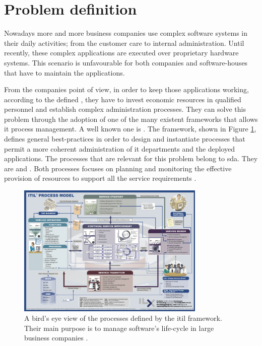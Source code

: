 %
%
\section{Problem definition}
\label{sec:background-problem}
Nowadays more and more business companies use complex software systems in their daily activities;
from the customer care to internal administration. Until recently, these complex applications are
executed over proprietary hardware systems. This scenario is unfavourable for both companies and
software-houses that have to maintain the applications.

From the companies point of view, in order to keep those applications working, according
to the defined , they have to invest economic resources in qualified personnel and 
establish complex administration processes. They can solve this problem through the adoption of 
one of the many existent frameworks that allows \acs{it} process management. A well known one is
. The framework, shown in Figure \ref{img:background-problem-itilProcessModel}, 
defines general best-practices in order to design and instantiate processes that permit a more coherent
administration of \acs{it} departments and the deployed applications. The processes that are relevant
for this problem belong to \ac{sda}. They are   and . Both processes
focuses on planning and monitoring the effective provision of resources to support all the service
requirements \cite{availabilityCapacityProcesses}.

\begin{figure}
	\centering{}
	\includegraphics[width=0.8\textwidth]{chapters/background/images/itil-map.png}
	\caption[\acs{itil} v3 process model]{A bird's eye view of the processes defined by the \acf{itil} 
		framework. Their main purpose is to manage software's life-cycle in large business companies
		\cite{itilProcessModel}.}
	\label{img:background-problem-itilProcessModel}
\end{figure}

